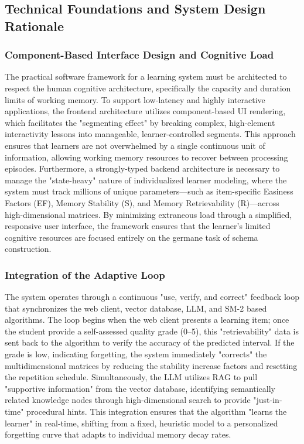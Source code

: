 \subsection{Technical Foundations and System Design Rationale}
\subsubsection{Component-Based Interface Design and Cognitive Load}
The practical software framework for a learning system must be architected to respect the human cognitive architecture, specifically the capacity and duration limits of working memory. To support low-latency and highly interactive applications, the frontend architecture utilizes component-based UI rendering, which facilitates the "segmenting effect" by breaking complex, high-element interactivity lessons into manageable, learner-controlled segments. This approach ensures that learners are not overwhelmed by a single continuous unit of information, allowing working memory resources to recover between processing episodes. Furthermore, a strongly-typed backend architecture is necessary to manage the "state-heavy" nature of individualized learner modeling, where the system must track millions of unique parameters—such as item-specific Easiness Factors (EF), Memory Stability (S), and Memory Retrievability (R)—across high-dimensional matrices. By minimizing extraneous load through a simplified, responsive user interface, the framework ensures that the learner’s limited cognitive resources are focused entirely on the germane task of schema construction\cite{Cog2019Sweller, mayer2003, studiomg_cognitive_ai}.

\subsubsection{Integration of the Adaptive Loop}
The system operates through a continuous "use, verify, and correct" feedback loop that synchronizes the web client, vector database, LLM, and SM-2 based algorithms. The loop begins when the web client presents a learning item; once the student provide a self-assessed quality grade (0–5), this "retrievability" data is sent back to the algorithm to verify the accuracy of the predicted interval. If the grade is low, indicating forgetting, the system immediately "corrects" the multidimensional matrices by reducing the stability increase factors and resetting the repetition schedule. Simultaneously, the LLM utilizes RAG to pull "supportive information" from the vector database, identifying semantically related knowledge nodes through high-dimensional search to provide "just-in-time" procedural hints. This integration ensures that the algorithm "learns the learner" in real-time, shifting from a fixed, heuristic model to a personalized forgetting curve that adapts to individual memory decay rates\cite{wozniak1998sm2, pokrywka2023lstm_srs}.